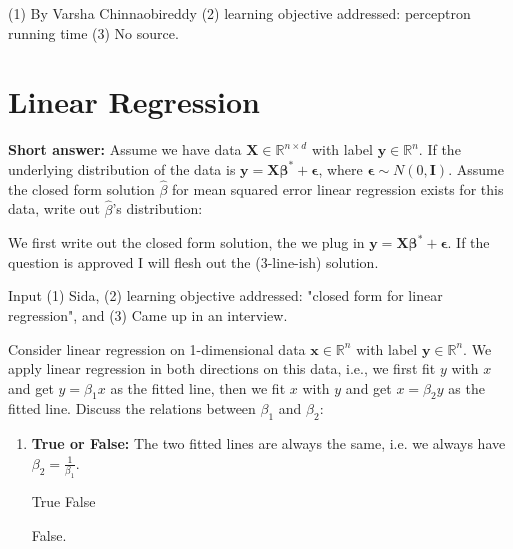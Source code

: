 \begin{questions}
    \begin{qauthor}
    (1) By Varsha Chinnaobireddy
    (2) learning objective addressed: perceptron running time 
    (3) No source.
    \end{qauthor}
\end{questions}

\section{Linear Regression}
\begin{questions}
\question [] \textbf{Short answer:} Assume we have data $\mathbf{X} \in \mathbb{R}^{n \times d}$ with label $\mathbf{y} \in \mathbb{R}^n$. If the underlying distribution of the data is $\mathbf{y} = \mathbf{X} \mathbf{\beta}^* + \mathbf{\epsilon}$, where $\mathbf{\epsilon} \sim N(0, \mathbf{I})$. Assume the closed form solution $\hat{\beta}$ for mean squared error linear regression exists for this data, write out $\hat{\beta}$'s distribution:
    \fillwithlines{2em}
    \begin{soln}
    We first write out the closed form solution, the we plug in $\mathbf{y} = \mathbf{X} \mathbf{\beta}^* + \mathbf{\epsilon}$. If the question is approved I will flesh out the (3-line-ish) solution.
    
    \end{soln}
    \begin{qauthor}
    Input (1) Sida, (2) learning objective addressed: "closed form for linear regression", and (3) Came up in an interview.
    \end{qauthor}


\question [] Consider linear regression on 1-dimensional data $\mathbf{x} \in \mathbb{R}^{n}$ with label $\mathbf{y} \in \mathbb{R}^n$. We apply linear regression in both directions on this data, i.e., we first fit $y$ with $x$ and get $y = \beta_1 x$ as the fitted line, then we fit $x$ with $y$ and get $x = \beta_2 y$ as the fitted line. Discuss the relations between $\beta_1$ and $\beta_2$:

\begin{enumerate} [label=(\roman*)]
\item \textbf{True or False:} The two fitted lines are always the same, i.e. we always have $\beta_2 = \frac{1}{\beta_1}$.

\begin{checkboxes}
     \choice True 
     \choice False
    \end{checkboxes}
    \begin{soln}
    False.
    \end{soln}


\end{enumerate}
\end{questions}
